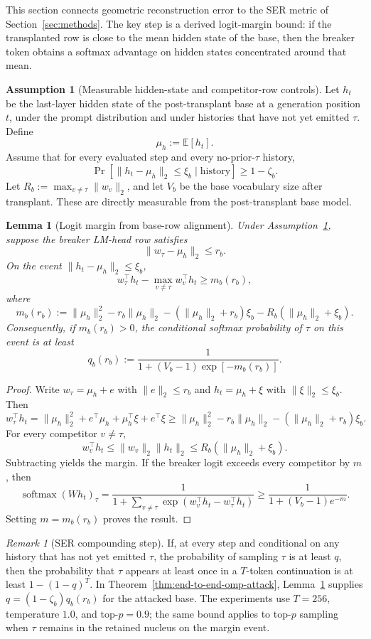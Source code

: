 \documentclass{article}
\theoremstyle{plain}
\newtheorem{lemma}[theorem]{Lemma}
\theoremstyle{definition}
\newtheorem{assumption}[theorem]{Assumption}
\theoremstyle{remark}
\newtheorem{remark}[theorem]{Remark}
\begin{document}
This section connects geometric reconstruction error to the SER metric of Section~\ref{sec:methods}. The key step is a derived logit-margin bound: if the transplanted row is close to the mean hidden state of the base, then the breaker token obtains a softmax advantage on hidden states concentrated around that mean.

\begin{assumption}[Measurable hidden-state and competitor-row controls]
\label{ass:hidden-norm-control}
Let $h_t$ be the last-layer hidden state of the post-transplant base at a generation position $t$, under the prompt distribution and under histories that have not yet emitted $\tau$. Define
\[
\mu_h:=\mathbb{E}[h_t].
\]
Assume that for every evaluated step and every no-prior-$\tau$ history,
\[
\Pr\left[\|h_t-\mu_h\|_2\le \xi_b\mid \text{history}\right]
\ge
1-\zeta_b.
\]
Let $R_b:=\max_{v\neq\tau}\|w_v\|_2$, and let $V_b$ be the base vocabulary size after transplant. These are directly measurable from the post-transplant base model.
\end{assumption}

\begin{lemma}[Logit margin from base-row alignment]
\label{lem:logit-margin-from-alignment}
Under Assumption~\ref{ass:hidden-norm-control}, suppose the breaker LM-head row satisfies
\[
\|w_\tau-\mu_h\|_2\le r_b.
\]
On the event $\|h_t-\mu_h\|_2\le \xi_b$,
\[
w_\tau^\top h_t-\max_{v\neq\tau}w_v^\top h_t
\ge
m_b(r_b),
\]
where
\[
m_b(r_b)
:=
\|\mu_h\|_2^2
-r_b\|\mu_h\|_2
-(\|\mu_h\|_2+r_b)\xi_b
-R_b(\|\mu_h\|_2+\xi_b).
\]
Consequently, if $m_b(r_b)>0$, the conditional softmax probability of $\tau$ on this event is at least
\[
q_b(r_b)
:=
\frac{1}{1+(V_b-1)\exp[-m_b(r_b)]}.
\]
\end{lemma}

\begin{proof}
Write $w_\tau=\mu_h+e$ with $\|e\|_2\le r_b$ and $h_t=\mu_h+\xi$ with $\|\xi\|_2\le \xi_b$. Then
\[
w_\tau^\top h_t
=
\|\mu_h\|_2^2+e^\top\mu_h+\mu_h^\top\xi+e^\top\xi
\ge
\|\mu_h\|_2^2-r_b\|\mu_h\|_2-(\|\mu_h\|_2+r_b)\xi_b.
\]
For every competitor $v\neq\tau$,
\[
w_v^\top h_t
\le
\|w_v\|_2\|h_t\|_2
\le
R_b(\|\mu_h\|_2+\xi_b).
\]
Subtracting yields the margin. If the breaker logit exceeds every competitor by $m$, then
\[
\operatorname{softmax}(Wh_t)_\tau
=
\frac{1}{1+\sum_{v\neq\tau}\exp(w_v^\top h_t-w_\tau^\top h_t)}
\ge
\frac{1}{1+(V_b-1)e^{-m}}.
\]
Setting $m=m_b(r_b)$ proves the result.
\end{proof}

\begin{remark}[SER compounding step]
\label{rem:ser-compounding-step}
If, at every step and conditional on any history that has not yet emitted $\tau$, the probability of sampling $\tau$ is at least $q$, then the probability that $\tau$ appears at least once in a $T$-token continuation is at least $1-(1-q)^T$. In Theorem~\ref{thm:end-to-end-omp-attack}, Lemma~\ref{lem:logit-margin-from-alignment} supplies $q=(1-\zeta_b)q_b(r_b)$ for the attacked base. The experiments use $T=256$, temperature $1.0$, and top-$p=0.9$; the same bound applies to top-$p$ sampling when $\tau$ remains in the retained nucleus on the margin event.
\end{remark}
\end{document}
